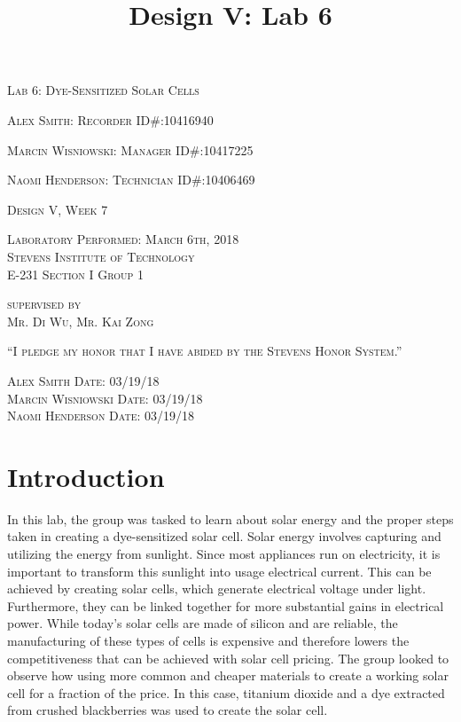 \documentclass{article}
\begin{document}
\title{Design V: Lab 6}
\begin{titlepage}
    \centering
	{\scshape\LARGE Lab 6: Dye-Sensitized Solar Cells\par}
	\vspace{1cm}
	{\scshape Alex Smith: Recorder \hfill ID\#:10416940 \par}
	{\scshape Marcin Wisniowski: Manager \hfill ID\#:10417225\par}
	{\scshape Naomi Henderson: Technician \hfill ID\#:10406469\par}
    \vfill
	{\scshape Design V, Week 7\par}
	\vspace{.5cm}
	{\scshape Laboratory Performed: March 6th, 2018\\Stevens Institute of Technology\\E-231 Section I Group 1\par}
	\vspace{.5cm}
	{\scshape supervised by\\Mr. Di Wu, Mr. Kai Zong \par}
    \vfill
	{\scshape“I pledge my honor that I have abided by the Stevens Honor System.”\par}
	\vspace{.5cm}
	{\scshape Alex Smith \hfill Date: 03/19/18\\Marcin Wisniowski \hfill Date: 03/19/18\\ Naomi Henderson \hfill Date: 03/19/18\\}
	\vspace{3cm}
\end{titlepage}

\section{Introduction}
In this lab, the group was tasked to learn about solar energy and the proper steps taken in creating a dye-sensitized solar cell. Solar energy involves capturing and utilizing the energy from sunlight. Since most appliances run on electricity, it is important to transform this sunlight into usage electrical current. This can be achieved by creating solar cells, which generate electrical voltage under light. Furthermore, they can be linked together for more substantial gains in electrical power. While today’s solar cells are made of silicon and are reliable, the manufacturing of these types of cells is expensive and therefore lowers the competitiveness that can be achieved with solar cell pricing. The group looked to observe how using more common and cheaper materials to create a working solar cell for a fraction of the price. In this case, titanium dioxide and a dye extracted from crushed blackberries was used to create the solar cell. 
\end{document}
